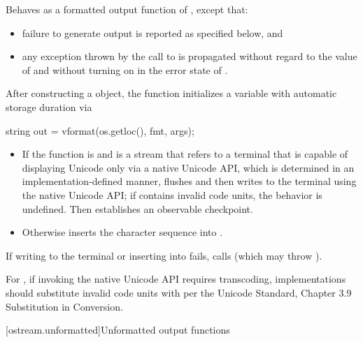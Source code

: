 \begin{itemdescr}
\pnum
\effects
Behaves as a formatted output function
of , except that:
\begin{itemize}
\item
failure to generate output is reported as specified below, and
\item
any exception thrown by the call to  is propagated
without regard to the value of  and
without turning on  in the error state of .
\end{itemize}

\par %
After constructing a  object,
the function initializes a variable with automatic storage duration via
\begin{codeblock}
string out = vformat(os.getloc(), fmt, args);
\end{codeblock}
\begin{itemize}
\item
If the function is  and
 is a stream that refers to a terminal that
is capable of displaying Unicode only via a native Unicode API,
which is determined in an implementation-defined manner,
flushes  and then
writes  to the terminal using the native Unicode API;
if  contains invalid code units,
%
the behavior is undefined.
Then establishes an observable checkpoint.
\item
Otherwise
inserts the character sequence
 into .
\end{itemize}

\par %
If writing to the terminal or inserting into  fails,
calls 
(which may throw ).

\pnum
\recommended
For ,
if invoking the native Unicode API requires transcoding,
implementations should substitute invalid code units
with  per
the Unicode Standard, Chapter 3.9  Substitution in Conversion.
\end{itemdescr}

[ostream.unformatted]{Unformatted output functions}

